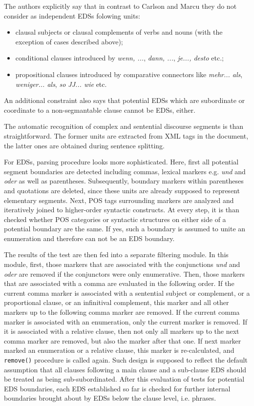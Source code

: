 \documentclass[a4paper,11pt]{article}
\begin{document}
The authors explicitly say that in contrast to Carlson and Marcu
\cite{Carlson-Marcu-01} they do not consider as independent EDSs folowing
units:
\begin{itemize}
  \item clausal subjects or clausal complements of verbs and nouns (with the
    exception of cases described above);
  \item conditional clauses introduced by \textit{wenn, ...}, \textit{dann,
    ...}, \textit{je..., desto} etc.;
  \item propositional clauses introduced by comparative connectors like
    \textit{mehr... als}, \textit{weniger... als}, \textit{so JJ... wie} etc.
\end{itemize}
An additional constraint also says that potential EDSs which are subordinate
or coordinate to a non-segmantable clause cannot be EDSs, either.

The automatic recognition of complex and sentential discourse segments is than
straightforward.  The former units are extracted from XML tags in the
document, the latter ones are obtained during sentence splitting.

For EDSs, parsing procedure looks more sophisticated.  Here, first all
potential segment boundaries are detected including commas, lexical
markers e.g. \textit{und} and \textit{oder} as well as parentheses.
Subsequently, boundary markers within parentheses and quotations are
deleted, since these units are already supposed to represent
elementary segments.  Next, POS tags surrounding markers are analyzed
and iteratively joined to higher-order syntactic constructs.  At every
step, it is than checked whether POS categories or syntactic
structures on either side of a potential boundary are the same.  If
yes, such a boundary is assumed to unite an enumeration and therefore
can not be an EDS boundary.

The results of the test are then fed into a separate filtering module.  In
this module, first, those markers that are associated with the conjunctions
\textit{und} and \textit{oder} are removed if the conjunctors were only
enumerative.  Then, those markers that are associated with a comma are
evaluated in the following order.  If the current comma marker is associated
with a sentential subject or complement, or a proportional clause, or an
infinitival complement, this marker and all other markers up to the following
comma marker are removed.  If the current comma marker is associated with an
enumeration, only the current marker is removed.  If it is associated with a
relative clause, then not only all markers up to the next comma marker are
removed, but also the marker after that one.  If next marker marked an
enumeration or a relative clause, this marker is re-calculated, and
\texttt{remove()} procedure is called again.  Such design is supposed to
reflect the default assumption that all clauses following a main clause and a
sub-clause EDS should be treated as being sub-subordinated.  After this
evaluation of tests for potential EDS boundaries, each EDS established so far
is checked for further internal boundaries brought about by EDSs below the
clause level, i.e. phrases.
\end{document}
